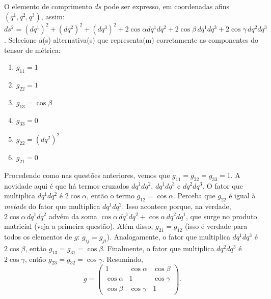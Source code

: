 \begin{question}
    O elemento de comprimento $ds$ pode ser expresso, em coordenadas afins $(q^1, q^2, q^3)$, assim: $ds^2 = (dq^1)^2 + (dq^2)^2 + (dq^3)^2 + 2\cos\alpha dq^1 dq^2 + 2 \cos\beta\, dq^1 dq^3 + 2 \cos\gamma\, dq^2 dq^3$.
    Selecione a(s) alternativa(s) que representa(m) corretamente as componentes do tensor de métrica:
    \begin{enumerate}
      \item $g_{11} = 1$ \rightanswer
      \item $g_{22} = 1$ \rightanswer
      \item $g_{13} = \cos\beta$ \rightanswer
      \item $g_{33} = 0$
      \item $g_{22} = (dq^2)^2$
      \item $g_{21} = 0$
    \end{enumerate}

    \begin{solution}
      Procedendo como nas questões anteriores, vemos que $g_{11} = g_{22} = g_{33} = 1$.
      A novidade aqui é que há termos cruzados $dq^1 dq^2$, $dq^1 dq^3$ e $dq^2 dq^3$.
      O fator que multiplica $dq^1 dq^2$ é $2\cos\alpha$, então o termo $g_{12} = \cos\alpha$.
      Perceba que $g_{22}$ é igual à \emph{metade} do fator que multiplica $dq^1 dq^2$.
      Isso acontece porque, na verdade, $2\cos\alpha\, dq^1 dq^2$ advém da soma $\cos\alpha\, dq^1 dq^2 + \cos\alpha\, dq^2 dq^1$, que surge no produto matricial (veja a primeira questão).
      Além disso, $g_{21} = g_{12}$ (isso é verdade para todos os elementos de $g$: $g_{ij} = g_{ji}$).
      Analogamente, o fator que multiplica $dq^1 dq^3$ é $2 \cos\beta$, então $g_{13} = g_{31} = \cos\beta$.
      Finalmente, o fator que multiplica $dq^2 dq^3$ é $2 \cos\gamma$, então $g_{23} = g_{32} = \cos\gamma$.
      Resumindo,
      \begin{equation*}
        g = \begin{pmatrix}
          1          & \cos\alpha & \cos\beta  \\
          \cos\alpha & 1          & \cos\gamma \\
          \cos\beta  & \cos\gamma & 1
        \end{pmatrix}.
      \end{equation*}
    \end{solution}
\end{question}